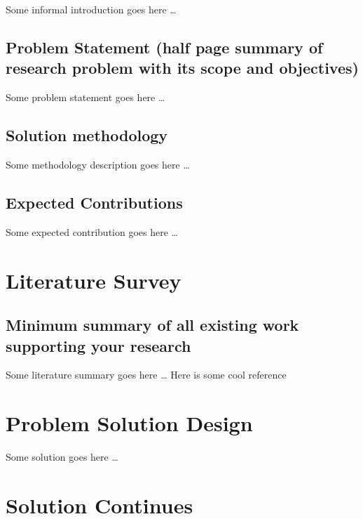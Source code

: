 \documentclass[]{article}
\begin{document}
Some informal introduction goes here \ldots{}

\subsection{Problem Statement (half page summary of research problem
with its scope and
objectives)}\label{problem-statement-half-page-summary-of-research-problem-with-its-scope-and-objectives}

Some problem statement goes here \ldots{}

\subsection{Solution methodology}\label{solution-methodology}

Some methodology description goes here \ldots{}

\subsection{Expected Contributions}\label{expected-contributions}

Some expected contribution goes here \ldots{}

\section{Literature Survey}\label{literature-survey}

\subsection{Minimum summary of all existing work supporting your
research}\label{minimum-summary-of-all-existing-work-supporting-your-research}

Some literature summary goes here \ldots{} Here is some cool reference
\citep{Goodfellow-et-al-2016}

\section{Problem Solution Design}\label{problem-solution-design}

Some solution goes here \ldots{}

\section{Solution Continues}\label{solution-continues}
\end{document}
